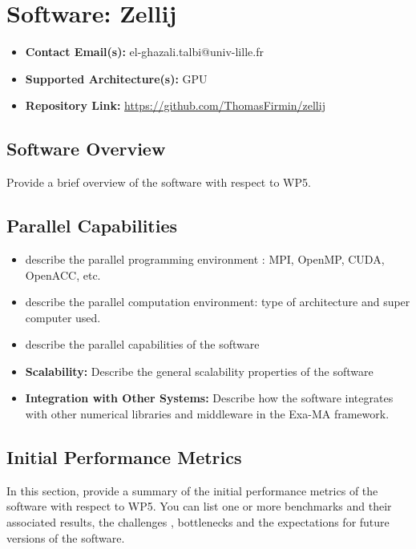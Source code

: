\section{Software: Zellij}
\label{sec:WP5:Zellij:software}

\begin{itemize}
    \item \textbf{Contact Email(s):} el-ghazali.talbi@univ-lille.fr
    \item \textbf{Supported Architecture(s):} GPU
    \item \textbf{Repository Link:} \href{https://github.com/ThomasFirmin/zellij}{https://github.com/ThomasFirmin/zellij}
\end{itemize}

\subsection{Software Overview}
\label{sec:WP5:Zellij:summary}

Provide a brief overview of the software with respect to WP5.

\subsection{Parallel Capabilities}
\label{sec:WP5:Zellij:performances}


\begin{itemize}
    \item describe the parallel programming  environment : MPI, OpenMP, CUDA, OpenACC, etc.
    \item describe the parallel computation environment: type of architecture and super computer used.
    \item describe the parallel capabilities of the software
    \item \textbf{Scalability:} Describe the general scalability properties of the software
    \item \textbf{Integration with Other Systems:} Describe how the software integrates with other numerical libraries and middleware in the Exa-MA framework.
\end{itemize}

\subsection{Initial Performance Metrics}
\label{sec:WP5:Zellij:metrics}

In this section, provide a summary of the initial performance metrics of the software with respect to WP5.
You can list one or more benchmarks and their associated results, the challenges , bottlenecks and the expectations for future versions of the software.



